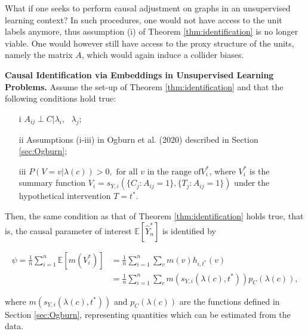\documentclass{article}
\begin{document}
What if one seeks to perform causal adjustment on graphs in an unsupervised learning context? In such procedures, one would not have access to the unit labels anymore, thus assumption (i) of Theorem \ref{thm:identification} is no longer viable. One would however still have access to the proxy structure of the units, namely the matrix $A$, which would again induce a collider biases. 



\begin{corollary} \textbf{Causal Identification via Embeddings in Unsupervised Learning Problems.}
\label{cor:identification}
Assume the set-up of Theorem \ref{thm:identification} and that the following conditions hold true:


\begin{itemize}
\item[i]  $A_{ij} \perp C  | \lambda_i, \mbox{ } \lambda_j$;
\item[ii]  Assumptions (i-iii) in Ogburn et al. (2020) \cite{Ogburn2020} described in Section \ref{sec:Ogburn};
\item[iii] $P(V = v| \lambda(c)) > 0, \mbox{ for all } v \mbox{ in the range of} V_i^*$, where $V_i^*$ is the summary function $V_i = s_{Y, i}(\{ C_j: A_{ij} =1\}, \{T_j: A_{ij} =1\})$ under the hypothetical intervention $ T = t^*$. 
\end{itemize}

Then, the same condition as that of Theorem \ref{thm:identification} holds true, that is,  the causal parameter of interest  $\mathbb{E}[\hat{Y}_n^*]$ is identified by

\begin{align}
\label{eqn:identification}
\psi = \frac{1}{n} \sum_{i=1}^n \mathbb{E}[m(V_i^*)] &= \frac{1}{n} \sum_{i=1}^n \sum_v m(v) h_{i, t^*} (v) \\
&= \frac{1}{n} \sum_{i=1}^n \sum_{c} m(s_{Y, i} (\lambda(c), t^*)) p_C(\lambda(c)),
\end{align}


\noindent where $m(s_{Y, i} (\lambda(c), t^*))$ and $p_C(\lambda(c))$ are the functions defined in Section \ref{sec:Ogburn}, representing quantities which can be estimated from the data.
\end{corollary}
\end{document}
